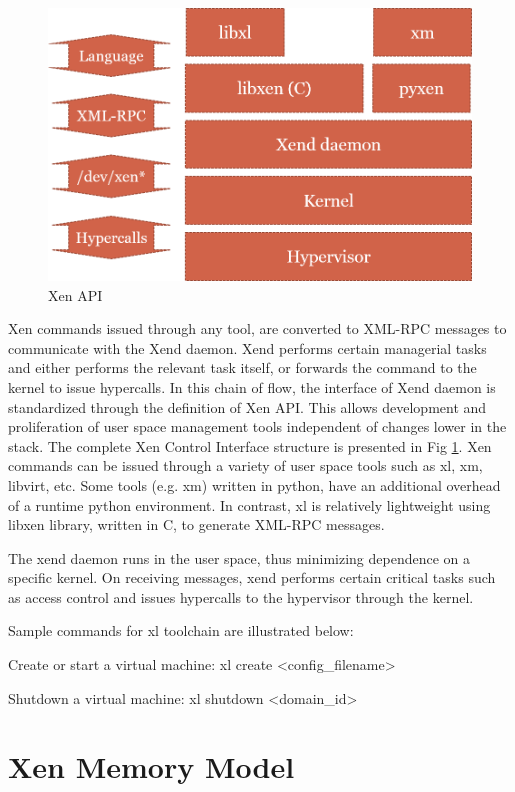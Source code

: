 \begin{figure}[H]
\centering
\includegraphics[scale=0.7]{figures/XEN_API.png}
\caption[Xen API]{Xen API \cite{chisnall_book}}
\label{fig:xen_api}
\end{figure}
Xen commands issued through any tool, are converted to XML-RPC messages to communicate with the Xend daemon. Xend performs certain managerial tasks and either performs the relevant task itself, or forwards the command to the kernel to issue hypercalls. In this chain of flow, the interface of Xend daemon is standardized through the definition of Xen API. This allows development and proliferation of user space management tools independent of changes lower in the stack. The complete Xen Control Interface structure is presented in Fig \ref{fig:xen_api}. Xen commands can be issued through a variety of user space tools such as xl, xm, libvirt, etc. Some tools (e.g. xm) written in python, have an additional overhead of a runtime python environment. In contrast, xl is relatively lightweight using libxen library, written in C, to generate XML-RPC messages.

The xend daemon runs in the user space, thus minimizing dependence on a specific kernel. On receiving messages, xend performs certain critical tasks such as access control and issues hypercalls to the hypervisor through the kernel.

Sample commands for xl toolchain are illustrated below:

Create or start a virtual machine: xl create <config\_filename>

Shutdown a virtual machine: xl shutdown <domain\_id> 


\section{Xen Memory Model}

